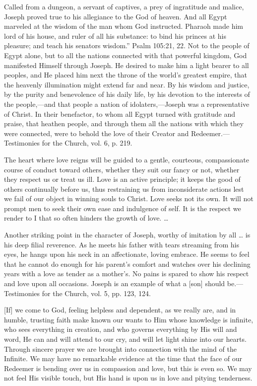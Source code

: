 \documentclass[a4paper, 10pt, twoside, headings=small]{scrartcl}
\begin{document}
\begin{multicols}{2}
Called from a dungeon, a servant of captives, a prey of ingratitude and malice, Joseph proved true to his allegiance to the God of heaven. And all Egypt marveled at the wisdom of the man whom God instructed. Pharaoh made him lord of his house, and ruler of all his substance: to bind his princes at his pleasure; and teach his senators wisdom.” Psalm 105:21, 22. Not to the people of Egypt alone, but to all the nations connected with that powerful kingdom, God manifested Himself through Joseph. He desired to make him a light bearer to all peoples, and He placed him next the throne of the world’s greatest empire, that the heavenly illumination might extend far and near. By his wisdom and justice, by the purity and benevolence of his daily life, by his devotion to the interests of the people,—and that people a nation of idolaters,—Joseph was a representative of Christ. In their benefactor, to whom all Egypt turned with gratitude and praise, that heathen people, and through them all the nations with which they were connected, were to behold the love of their Creator and Redeemer.—Testimonies for the Church, vol. 6, p. 219.

The heart where love reigns will be guided to a gentle, courteous, compassionate course of conduct toward others, whether they suit our fancy or not, whether they respect us or treat us ill. Love is an active principle; it keeps the good of others continually before us, thus restraining us from inconsiderate actions lest we fail of our object in winning souls to Christ. Love seeks not its own. It will not prompt men to seek their own ease and indulgence of self. It is the respect we render to I that so often hinders the growth of love. …

Another striking point in the character of Joseph, worthy of imitation by all … is his deep filial reverence. As he meets his father with tears streaming from his eyes, he hangs upon his neck in an affectionate, loving embrace. He seems to feel that he cannot do enough for his parent’s comfort and watches over his declining years with a love as tender as a mother’s. No pains is spared to show his respect and love upon all occasions. Joseph is an example of what a [son] should be.—Testimonies for the Church, vol. 5, pp. 123, 124.

[If] we come to God, feeling helpless and dependent, as we really are, and in humble, trusting faith make known our wants to Him whose knowledge is infinite, who sees everything in creation, and who governs everything by His will and word, He can and will attend to our cry, and will let light shine into our hearts. Through sincere prayer we are brought into connection with the mind of the Infinite. We may have no remarkable evidence at the time that the face of our Redeemer is bending over us in compassion and love, but this is even so. We may not feel His visible touch, but His hand is upon us in love and pitying tenderness.


\end{multicols}
\end{document}
